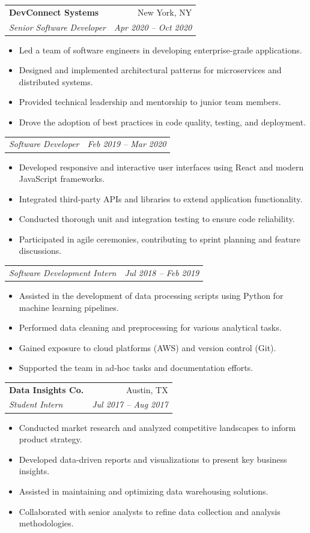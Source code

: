 \documentclass[letterpaper,10pt]{article}
\makeatletter
\newcommand{\resumeSubheading}[4]{
  \vspace{-1pt}\item
    \begin{tabular*}{0.97\textwidth}[t]{l@{\extracolsep{\fill}}r}
      \textbf{#1} & #2 \\
      \textit{\footnotesize#3} & \textit{\footnotesize #4} \\
    \end{tabular*}\vspace{-5pt}
}
\newcommand{\resumeSubSubheading}[2]{
    \begin{tabular*}{0.97\textwidth}{l@{\extracolsep{\fill}}r}
      \textit{\footnotesize#1} & \textit{\footnotesize #2} \\
    \end{tabular*}\vspace{-5pt}
}
\newcommand{\resumeItemListStart}{\begin{itemize}}
\newcommand{\resumeItemListEnd}{\end{itemize}\vspace{-5pt}}
\makeatother
\begin{document}
    \resumeSubheading
      {DevConnect Systems}{New York, NY}
      {Senior Software Developer}{Apr 2020 -- Oct 2020}
      \resumeItemListStart
        \item \small Led a team of software engineers in developing enterprise-grade applications.
        \item \small Designed and implemented architectural patterns for microservices and distributed systems.
        \item \small Provided technical leadership and mentorship to junior team members.
        \item \small Drove the adoption of best practices in code quality, testing, and deployment.
      \resumeItemListEnd

      \resumeSubSubheading{Software Developer}{Feb 2019 -- Mar 2020}
      \resumeItemListStart
        \item \small Developed responsive and interactive user interfaces using React and modern JavaScript frameworks.
        \item \small Integrated third-party APIs and libraries to extend application functionality.
        \item \small Conducted thorough unit and integration testing to ensure code reliability.
        \item \small Participated in agile ceremonies, contributing to sprint planning and feature discussions.
      \resumeItemListEnd

      \resumeSubSubheading{Software Development Intern}{Jul 2018 -- Feb 2019}
      \resumeItemListStart
        \item \small Assisted in the development of data processing scripts using Python for machine learning pipelines.
        \item \small Performed data cleaning and preprocessing for various analytical tasks.
        \item \small Gained exposure to cloud platforms (AWS) and version control (Git).
        \item \small Supported the team in ad-hoc tasks and documentation efforts.
      \resumeItemListEnd

    \resumeSubheading
      {Data Insights Co.}{Austin, TX}
      {Student Intern}{Jul 2017 -- Aug 2017}
      \resumeItemListStart
        \item \small Conducted market research and analyzed competitive landscapes to inform product strategy.
        \item \small Developed data-driven reports and visualizations to present key business insights.
        \item \small Assisted in maintaining and optimizing data warehousing solutions.
        \item \small Collaborated with senior analysts to refine data collection and analysis methodologies.
      \resumeItemListEnd
\end{document}
